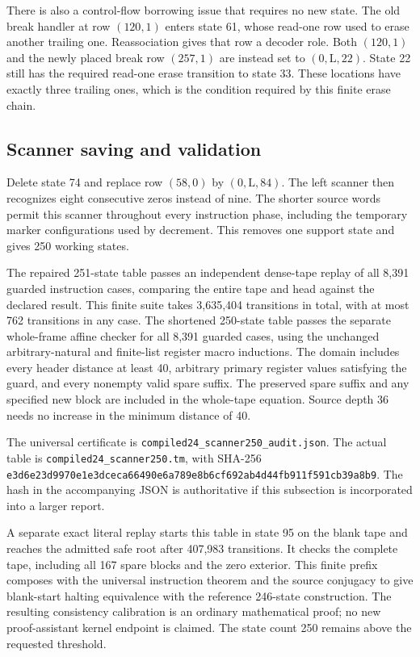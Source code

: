 There is also a control-flow borrowing issue that requires no new state.
The old break handler at row $(120,1)$ enters state 61, whose read-one row
used to erase another trailing one. Reassociation gives that row a decoder
role. Both $(120,1)$ and the newly placed break row $(257,1)$ are instead set
to $(0,\mathrm L,22)$. State 22 still has the required read-one erase
transition to state 33. These locations have exactly three trailing ones,
which is the condition required by this finite erase chain.

\subsection{Scanner saving and validation}
Delete state 74 and replace row $(58,0)$ by $(0,\mathrm L,84)$. The left
scanner then recognizes eight consecutive zeros instead of nine. The
shorter source words permit this scanner throughout every instruction
phase, including the temporary marker configurations used by decrement.
This removes one support state and gives 250 working states.

The repaired 251-state table passes an independent dense-tape replay of all
8,391 guarded instruction cases, comparing the entire tape and head against
the declared result. This finite suite takes 3,635,404 transitions in total,
with at most 762 transitions in any case. The shortened 250-state table
passes the separate whole-frame affine checker for all 8,391 guarded cases,
using the unchanged arbitrary-natural and finite-list register macro
inductions. The domain includes every header distance at least 40,
arbitrary primary register values satisfying the guard, and every nonempty
valid spare suffix. The preserved spare suffix and any specified new block
are included in the whole-tape equation. Source depth 36 needs no increase
in the minimum distance of 40.

The universal certificate is
\texttt{compiled24\_scanner250\_audit.json}. The actual table is
\texttt{compiled24\_scanner250.tm}, with SHA-256
\texttt{e3d6e23d9970e1e3dceca66490e6a789e8b6cf692ab4d44fb911f591cb39a8b9}.
The hash in the accompanying JSON is authoritative if this subsection is
incorporated into a larger report.

A separate exact literal replay starts this table in state 95 on the blank
tape and reaches the admitted safe root after 407,983 transitions. It checks
the complete tape, including all 167 spare blocks and the zero exterior.
This finite prefix composes with the universal instruction theorem and the
source conjugacy to give blank-start halting equivalence with the reference
246-state construction. The resulting consistency calibration is an
ordinary mathematical proof; no new proof-assistant kernel endpoint is
claimed. The state count 250 remains above the requested threshold.

